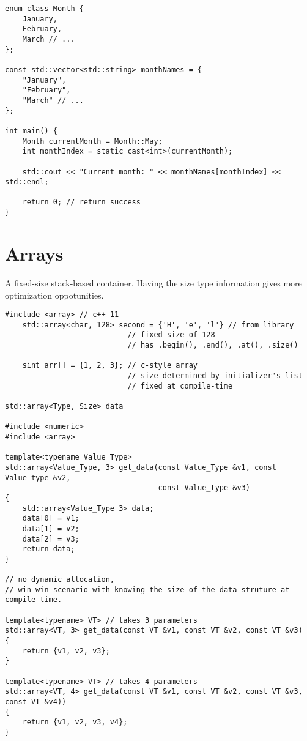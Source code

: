 \begin{verbatim}
enum class Month {
    January,
    February,
    March // ...
};

const std::vector<std::string> monthNames = {
    "January",
    "February",
    "March" // ... 
};

int main() {
    Month currentMonth = Month::May;
    int monthIndex = static_cast<int>(currentMonth);

    std::cout << "Current month: " << monthNames[monthIndex] << std::endl;

    return 0; // return success
}
\end{verbatim}


\section{Arrays}

A fixed-size stack-based container. Having the size type information gives more optimization oppotunities.

\begin{verbatim}
#include <array> // c++ 11
    std::array<char, 128> second = {'H', 'e', 'l'} // from library
                            // fixed size of 128
                            // has .begin(), .end(), .at(), .size() 

    sint arr[] = {1, 2, 3}; // c-style array 
                            // size determined by initializer's list
                            // fixed at compile-time 

std::array<Type, Size> data

#include <numeric>
#include <array>

template<typename Value_Type>
std::array<Value_Type, 3> get_data(const Value_Type &v1, const Value_type &v2,
                                   const Value_type &v3)
{
    std::array<Value_Type 3> data;
    data[0] = v1;
    data[1] = v2;
    data[2] = v3;
    return data;
}

// no dynamic allocation, 
// win-win scenario with knowing the size of the data struture at compile time.

template<typename> VT> // takes 3 parameters
std::array<VT, 3> get_data(const VT &v1, const VT &v2, const VT &v3)
{
    return {v1, v2, v3};
}

template<typename> VT> // takes 4 parameters
std::array<VT, 4> get_data(const VT &v1, const VT &v2, const VT &v3, const VT &v4))
{
    return {v1, v2, v3, v4};
}
\end{verbatim}

